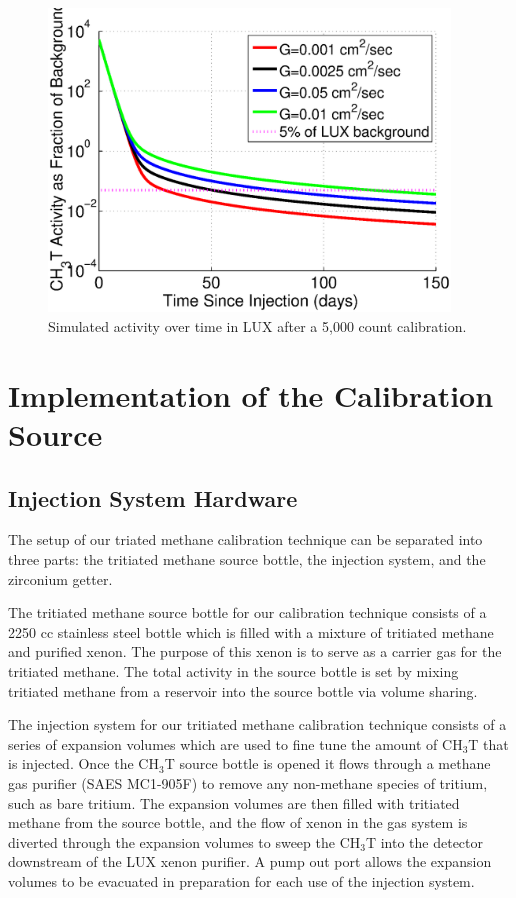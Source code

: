 \begin{figure}[H]
\centering
\includegraphics[width=0.95\textwidth]{LUXActivityOverTime.eps}
\caption{Simulated activity over time in LUX after a 5,000 count calibration.}
\label{fig:LUXActivity}
\end{figure}

\section{Implementation of the Calibration Source}

\subsection{Injection System Hardware}

The setup of our triated methane calibration technique can be separated into three parts: the tritiated methane source bottle, the injection system,  and the zirconium getter.

The tritiated methane source bottle for our calibration technique consists of a 2250 cc stainless steel bottle which is filled with a mixture of tritiated methane and purified xenon.  The purpose of this xenon is to serve as a carrier gas for the tritiated methane.  The total activity in the source bottle is set by mixing tritiated methane from a reservoir into the source bottle via volume sharing.

The injection system for our tritiated methane calibration technique consists of a series of expansion volumes which are used to fine tune the amount of CH$_3$T that is injected.  Once the CH$_3$T source bottle is opened it flows through a methane gas purifier (SAES MC1-905F) to remove any non-methane species of tritium, such as bare tritium. The expansion volumes are then filled with tritiated methane from the source bottle, and the flow of xenon in the gas system is diverted through the expansion volumes to sweep the CH$_3$T into the detector downstream of the LUX xenon purifier.  A pump out port allows the expansion volumes to be evacuated in preparation for each use of the injection system.  

